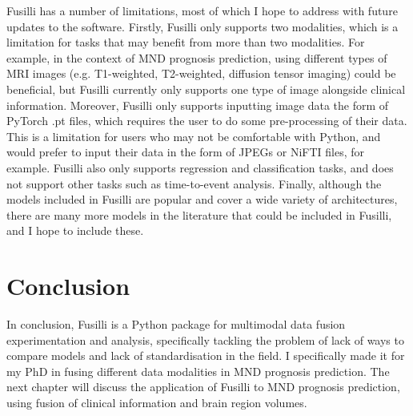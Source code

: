 Fusilli has a number of limitations, most of which I hope to address with future updates to the software.
Firstly, Fusilli only supports two modalities, which is a limitation for tasks that may benefit from more than two modalities.
For example, in the context of MND prognosis prediction, using different types of MRI images (e.g. T1-weighted, T2-weighted, diffusion tensor imaging) could be beneficial, but Fusilli currently only supports one type of image alongside clinical information.
Moreover, Fusilli only supports inputting image data the form of PyTorch .pt files, which requires the user to do some pre-processing of their data.
This is a limitation for users who may not be comfortable with Python, and would prefer to input their data in the form of JPEGs or NiFTI files, for example.
Fusilli also only supports regression and classification tasks, and does not support other tasks such as time-to-event analysis.
Finally, although the models included in Fusilli are popular and cover a wide variety of architectures, there are many more models in the literature that could be included in Fusilli, and I hope to include these.

\section{Conclusion}
In conclusion, Fusilli is a Python package for multimodal data fusion experimentation and analysis, specifically tackling the problem of lack of ways to compare models and lack of standardisation in the field.
I specifically made it for my PhD in fusing different data modalities in MND prognosis prediction.
The next chapter will discuss the application of Fusilli to MND prognosis prediction, using fusion of clinical information and brain region volumes.
